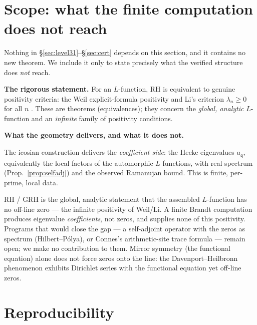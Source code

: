 \documentclass[11pt,a4paper]{article}
\newcommand{\fq}{\mathfrak{q}}
\begin{document}
\section{Scope: what the finite computation does not reach}\label{sec:rh}

Nothing in \S\ref{sec:level31}--\S\ref{sec:cert} depends on this
section, and it contains no new theorem. We include it only to state
precisely what the verified structure does \emph{not} reach.

\medskip\noindent\textbf{The rigorous statement.}
For an $L$-function, RH is equivalent to genuine positivity criteria:
the Weil explicit-formula positivity \cite{Weil1952} and Li's criterion
$\lambda_n\ge0$ for all $n$ \cite{Li1997,BombieriLagarias1999}. These
are theorems (equivalences); they concern the \emph{global, analytic}
$L$-function and an \emph{infinite} family of positivity conditions.

\medskip\noindent\textbf{What the geometry delivers, and what it does not.}
\begin{verifiedbox}
The icosian construction delivers the \emph{coefficient side}: the Hecke
eigenvalues $a_\fq$, equivalently the local factors of the automorphic
$L$-functions, with real spectrum (Prop.~\ref{prop:selfadj}) and the
observed Ramanujan bound. This is finite, per-prime, local data.
\end{verifiedbox}

\begin{opengapbox}
RH / GRH is the global, analytic statement that the assembled
$L$-function has no off-line zero --- the infinite positivity of
Weil/Li. A finite Brandt computation produces eigenvalue
\emph{coefficients}, not zeros, and supplies none of this positivity.
Programs that would close the gap --- a self-adjoint operator with the
zeros as spectrum (Hilbert--P\'olya), or Connes's arithmetic-site trace
formula \cite{Connes1999} --- remain open; we make no contribution to
them. Mirror symmetry (the functional equation) alone does not force
zeros onto the line: the Davenport--Heilbronn phenomenon
\cite{Davenport1936} exhibits Dirichlet series with the functional
equation yet off-line zeros.
\end{opengapbox}


\section{Reproducibility}\label{sec:repro}
\end{document}

